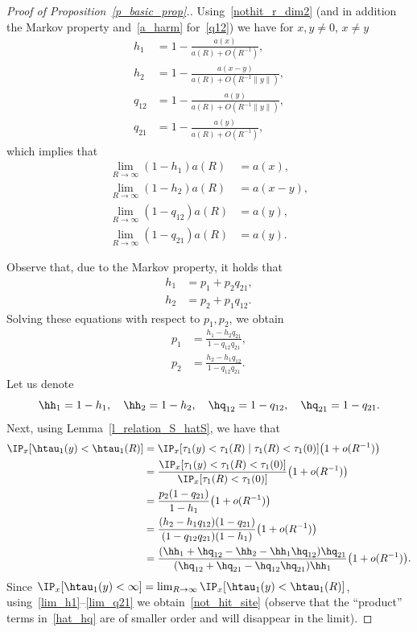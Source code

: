 \begin{proof}[Proof of Proposition~\ref{p_basic_prop}.]
Using~\eqref{nothit_r_dim2} (and in addition the Markov property and~\eqref{a_harm} for~\eqref{q12}) we have for $x,y \neq 0$, $x \neq y$
\begin{align}
h_1&=1-\frac{a(x)}{a(R)+O(R^{-1})},\label{h1}
\\
h_2&=1-\frac{a(x-y)}{a(R)+O(R^{-1}\|y\|)},\label{h2}
\\
q_{12}&=1-\frac{a(y)}{a(R)+O(R^{-1}\|y\|)},\label{q12}
\\
q_{21}&=1-\frac{a(y)}{a(R)+O(R^{-1})},\label{q21}
\end{align}
which implies that
\begin{align}
\lim_{R\to\infty} (1-h_1)a(R)&=a(x),\label{lim_h1}
\\
\lim_{R\to\infty} (1-h_2)a(R)&=a(x-y),\label{lim_h2}
\\
\lim_{R\to\infty} (1-q_{12})a(R) &= a(y),\label{lim_q12}
\\
\lim_{R\to\infty} (1-q_{21})a(R) &=a(y).\label{lim_q21}
\end{align}

Observe that, due to the Markov property, it holds that
\begin{align*}
h_1 &= p_1 + p_2q_{21},\\
h_2 &= p_2 + p_1q_{12}.
\end{align*}
Solving these equations with respect to $p_1,p_2$, we obtain
\begin{align}
p_1 &= \frac{h_1-h_2q_{21}}{1-q_{12}q_{21}},\label{expr_p1}
\\
p_2 &= \frac{h_2-h_1q_{12}}{1-q_{12}q_{21}}.\label{expr_p2}
\end{align}
Let us denote
\begin{equation}\label{bar_all}
\hh_1=1-h_1, \quad \hh_2=1-h_2,\quad
\hq_{12}=1-q_{12},\quad \hq_{21}=1-q_{21}.
\end{equation}
Next, using
Lemma~\ref{l_relation_S_hatS}, we have that
\begin{align}
\IP_x[\htau_1(y)<\htau_1(R)] &= \IP_x[\tau_1(y)<\tau_1(R)\mid \tau_1(R)<\tau_1(0)]
\big(1+o(R^{-1})\big)\nonumber\\
&=\frac{\IP_x[\tau_1(y)<\tau_1(R)<\tau_1(0)]}{\IP_x[\tau_1(R)<\tau_1(0)]}
\big(1+o(R^{-1})\big)\nonumber\\
&=\frac{p_2(1-q_{21})}{1-h_1} \big(1+o(R^{-1})\big)\nonumber\\
&= \frac{(h_2-h_1q_{12})(1-q_{21})}{(1-q_{12}q_{21})(1-h_1)}
\big(1+o(R^{-1})\big)\nonumber\\
&= \frac{(\hh_1+\hq_{12}-\hh_2-\hh_1\hq_{12})\hq_{21}} {(\hq_{12}+\hq_{21}-\hq_{12}\hq_{21})\hh_1} \big(1+o(R^{-1})\big).\label{hat_hq}
\end{align}
Since $\IP_x[\htau_1(y)<\infty]=\lim_{R\to\infty}
\IP_x[\htau_1(y)<\htau_1(R)]$, using~\eqref{lim_h1}--\eqref{lim_q21} we obtain~\eqref{not_hit_site} (observe that the ``product'' terms in~\eqref{hat_hq} are of smaller order and will disappear in the limit).
\end{proof}


